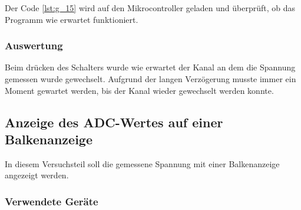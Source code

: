 \documentclass[12pt,a4paper]{article}
\begin{document}
Der Code \ref{lst:g_15} wird auf den Mikrocontroller geladen und überprüft, ob das Programm wie erwartet funktioniert.

\subsubsection*{Auswertung}

Beim drücken des Schalters wurde wie erwartet der Kanal an dem die Spannung gemessen wurde gewechselt. Aufgrund der langen Verzögerung musste immer ein Moment gewartet werden, bis der Kanal wieder gewechselt werden konnte.

\subsection{Anzeige des ADC-Wertes auf einer Balkenanzeige}

In diesem Versuchsteil soll die gemessene Spannung mit einer Balkenanzeige angezeigt werden.

\subsubsection*{Verwendete Geräte}
\end{document}

